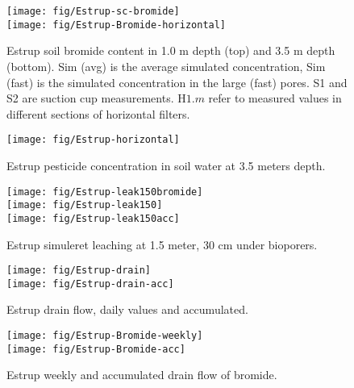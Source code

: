 \begin{figure}[htbp]
  \begin{center}
    \texttt{[image: fig/Estrup-sc-bromide]}\\
    \texttt{[image: fig/Estrup-Bromide-horizontal]}
  \end{center}
  \caption{Estrup soil bromide content in 1.0 m depth (top) and 3.5
    m depth (bottom).  Sim (avg) is the average simulated
    concentration, Sim (fast) is the simulated concentration in the
    large (fast) pores.  S1 and S2 are suction cup measurements.
    H$1$.$m$ refer to measured values in different sections of
    horizontal filters.}
  \label{fig:Estrup-bromide}
\end{figure}\FloatBarrier


\begin{figure}[htbp]
  \begin{center}
    \texttt{[image: fig/Estrup-horizontal]}
  \end{center}
  \caption{Estrup pesticide concentration in soil water at 3.5 meters
    depth.}
  \label{fig:Estrup-horizontal}
\end{figure}\FloatBarrier

\begin{figure}[htbp]
  \begin{center}
    \texttt{[image: fig/Estrup-leak150bromide]}\\
    \texttt{[image: fig/Estrup-leak150]}\\
    \texttt{[image: fig/Estrup-leak150acc]}
  \end{center}
  \caption{Estrup simuleret leaching at 1.5 meter, 30 cm under bioporers.}
  \label{fig:Estrup-leak150}
\end{figure}\FloatBarrier

\begin{figure}[htbp]
  \begin{center}
    \texttt{[image: fig/Estrup-drain]}\\
    \texttt{[image: fig/Estrup-drain-acc]}
  \end{center}
  \caption{Estrup drain flow, daily values and accumulated.}
  \label{fig:Estrup-drain}
\end{figure}\FloatBarrier

\begin{figure}[htbp]
  \begin{center}
    \texttt{[image: fig/Estrup-Bromide-weekly]}\\
    \texttt{[image: fig/Estrup-Bromide-acc]}
  \end{center}
  \caption{Estrup weekly and accumulated drain flow of bromide.}
  \label{fig:Estrup-bromide-weekly}
\end{figure}\FloatBarrier


